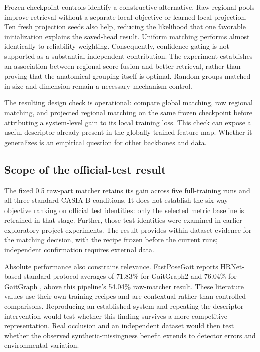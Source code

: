 \documentclass[pdflatex,iicol,sn-apa]{sn-jnl}
\begin{document}
Frozen-checkpoint controls identify a constructive alternative. Raw regional
pools improve retrieval without a separate local objective or learned local
projection. Ten fresh projection seeds also help, reducing the likelihood that
one favorable initialization explains the saved-head result. Uniform matching
performs almost identically to reliability weighting. Consequently, confidence
gating is not supported as a substantial independent contribution. The
experiment establishes an association between regional score fusion and better
retrieval, rather than proving that the anatomical grouping itself is optimal.
Random groups matched in size and dimension remain a necessary mechanism
control.

The resulting design check is operational: compare global matching, raw regional
matching, and projected regional matching on the same frozen checkpoint before
attributing a system-level gain to its local training loss. This check can
expose a useful descriptor already present in the globally trained feature map.
Whether it generalizes is an empirical question for other backbones and data.

\subsection{Scope of the official-test result}

The fixed 0.5 raw-part matcher retains its gain across five full-training runs
and all three standard CASIA-B conditions. It does not establish the six-way
objective ranking on official test identities: only the selected metric
baseline is retrained in that stage. Further, those test identities were
examined in earlier exploratory project experiments. The result provides
within-dataset evidence for the matching decision, with the recipe frozen
before the current runs; independent confirmation requires external data.

Absolute performance also constrains relevance. FastPoseGait reports
HRNet-based standard-protocol averages of 71.83\% for GaitGraph2 and 76.04\%
for GaitGraph \citep{meng2023fastposegait}, above this pipeline's 54.04\%
raw-matcher result. These literature values use their own training recipes and
are contextual rather than controlled comparisons. Reproducing an established
system and repeating the descriptor intervention would test whether this
finding survives a more competitive representation. Real occlusion and an
independent dataset would then test whether the observed synthetic-missingness
benefit extends to detector errors and environmental variation.
\end{document}
